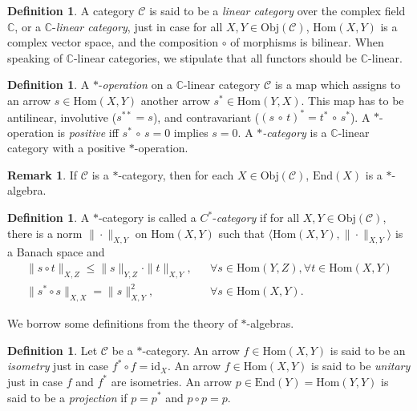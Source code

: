 \documentclass[11pt]{article}
\newcommand{\norm}[1]{\| #1\|}
\theoremstyle{definition}
\theoremstyle{definition}
\newtheorem{defn}[thm]{Definition}
\newtheorem{note}[thm]{Remark}
\theoremstyle{remark}
\newcommand{\Obj}{\mathrm{Obj}}
\def\2#1{{\mathcal #1}}
\def\7#1{{\mathbb #1}}
\newcommand{\Hom}{\mathrm{Hom}}
\newcommand{\End}{\mathrm{End}}
\newcommand{\mcirc}{\,\circ\,}
\def\id{\mathrm{id}}
\begin{document}
\begin{defn} A category $\2C$ is said to be a \emph{linear category} over the complex
  field $\mathbb{C}$, or a $\7C$-\emph{linear category}, just in case for all $X,Y\in
  \Obj (\2C )$, $\Hom (X,Y)$ is a complex vector space, and the composition $\circ$
  of morphisms is bilinear.  When speaking of $\7C$-linear categories, we stipulate
  that all functors should be $\mathbb{C}$-linear.
\end{defn}

\begin{defn} A $*$-\emph{operation} on a $\7C$-linear category $\2C$ is a map which
  assigns to an arrow $s\in\Hom(X,Y)$ another arrow $s^*\in\Hom(Y,X)$.  This map has
  to be antilinear, involutive ($s^{**}=s$), and contravariant ($(s\,\circ\,
  t)^*=t^*\mcirc s^*$).  A $*$-operation is \emph{positive} iff $s^*\mcirc s=0$
  implies $s=0$. A \emph{$*$-category} is a $\7C$-linear category with a positive
  $*$-operation. \end{defn}

\begin{note} If $\2C$ is a $*$-category, then for each $X\in \Obj (\2C )$, $\End (X)$
  is a $*$-algebra.  \end{note}

\begin{defn} A $*$-category is called a $C^*$-\emph{category} if for all $X,Y\in \Obj
  (\2C )$, there is a norm $\norm{\cdot }_{X,Y}$ on $\Hom (X,Y)$ such that $\langle
  \Hom (X,Y),\norm{\cdot }_{X,Y}\rangle$ is a Banach space and \[ \begin{array}{lll}
    \norm{s\circ t}_{X,Z} \leq \norm{s}_{Y,Z}\cdot \norm{t}_{X,Y}, & & \forall s\in
    \Hom (Y,Z) ,\forall t\in
    \Hom (X,Y) \\
    \norm{s^*\circ s}_{X,X}=\norm{s}_{X,Y}^2 ,& & \forall s\in \Hom (X,Y)
    .\end{array} \]
\end{defn} 

We borrow some definitions from the theory of $*$-algebras.

\begin{defn} Let $\2C$ be a $*$-category.  An arrow
  $f\in \Hom (X,Y)$ is said to be an \emph{isometry}
  just in case $f^*\circ f=\id _X$.  An arrow $f\in
  \Hom (X,Y)$ is said to be \emph{unitary} just in case
  $f$ and $f^*$ are isometries.  An arrow $p\in
  \End (Y)=\Hom (Y,Y)$ is said to be a \emph{projection} if $p=p^*$ and $p\circ p=p$.
\end{defn}
\end{document}
